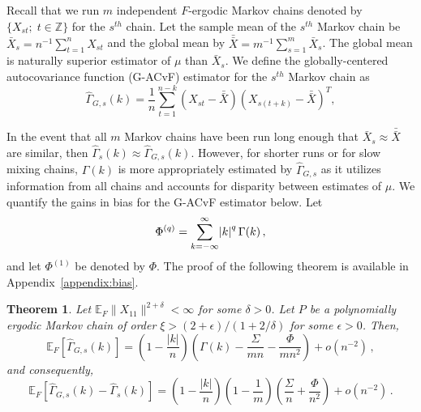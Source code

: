 \documentclass[11pt]{article}
\newcommand{\E}{\mathbb{E}}
\newtheorem{theorem}{Theorem}
\theoremstyle{remark}
\begin{document}
Recall that we run $m$ independent $F$-ergodic Markov chains denoted by $\{X_{st}; \; t \in \mathbb{Z}\}$ for the $s^{th}$ chain. Let the sample mean of the $s^{th}$ Markov chain be $\bar{X}_s = n^{-1} \sum_{t=1}^{n} X_{st}$ and the global mean by $\bar{\bar{X}} = m^{-1}\sum_{s = 1}^{m}\bar{X}_s$. The global mean is naturally superior estimator of $\mu$ than $\bar{X}_s$. We define the globally-centered autocovariance function (G-ACvF) estimator for the $s^{th}$ Markov chain as
%
\begin{equation} \label{eq:G-ACvF}
    \hat{\Gamma}_{G,s}(k) = \dfrac{1}{n} \sum_{t=1}^{n-k}(X_{st}-\bar{\bar{X}})(X_{s(t+k)}-\bar{\bar{X}})^T,
\end{equation}

In the event that all $m$ Markov chains have been run long enough that $\bar{X}_s \approx \bar{\bar{X}}$ are similar, then  $\hat{\Gamma}_{s} (k) \approx \hat{\Gamma}_{G,s}(k)$. However, for shorter runs or for slow mixing chains, $\Gamma(k)$ is more appropriately estimated by $\hat{\Gamma}_{G,s}$ as it utilizes information from all chains and accounts for disparity between estimates of $\mu$. We quantify the gains in  bias  for the G-ACvF estimator below.
Let 
\[
\Phi^{(q)} = \sum_{ k= -\infty}^{\infty}\abs{k}^q \Gamma(k)\,,
\]
and let $\Phi^{(1)}$ be denoted by $\Phi$.  The proof of the following theorem is available in Appendix~\ref{appendix:bias}.

\begin{theorem} \label{th:G-ACF_bias} Let $\E_F \|X_{11}\|^{2 + \delta} < \infty$ for some $\delta > 0$. Let $P$ be a  polynomially ergodic Markov chain of order $\xi > (2 + \epsilon)/(1 + 2/\delta)$ for some $\epsilon > 0$. Then,
\[
   \mathbb{E}_F\left[\hat{\Gamma}_{G,s}(k) \right] = \left(1- \dfrac{|k|}{n}\right) \left(\Gamma(k) - \dfrac{\Sigma}{mn} - \dfrac{\Phi}{mn^2}\right)  + o \left(n^{-2} \right)\,,
\]
and consequently,
\[
\mathbb{E}_F\left[\hat{\Gamma}_{G,s}(k) - \hat{\Gamma}_s(k) \right] =  \left(1- \dfrac{|k|}{n}\right)\left(1- \dfrac{1}{m}\right)\left(\dfrac{\Sigma}{n} + \dfrac{\Phi}{n^2}\right) + o\left(n^{-2} \right)\,. 
\]
\end{theorem}
\end{document}

